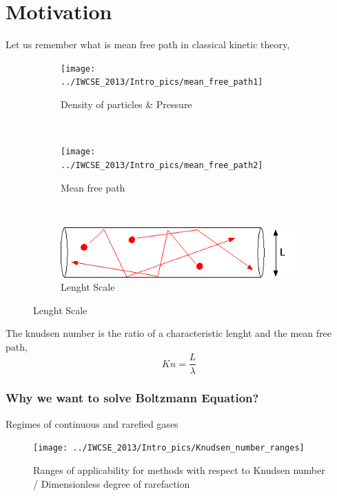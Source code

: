 \section{Motivation}

\begin{frame} 
  Let us remember what is mean free path in classical kinetic theory,
  \begin{figure}
        \centering
        \begin{subfigure}[b]{0.30\textwidth}
                \centering
                \texttt{[image: ../IWCSE\_2013/Intro\_pics/mean\_free\_path1]}
                \caption{Density of particles \& Pressure}
                \label{fig:particles_pressure}
        \end{subfigure}%
        ~ %
        \begin{subfigure}[b]{0.30\textwidth}
                \centering
                \texttt{[image: ../IWCSE\_2013/Intro\_pics/mean\_free\_path2]}
                \caption{Mean free path}
                \label{fig:mean_free_path}
				\end{subfigure}
				~ %
        \begin{subfigure}[b]{0.30\textwidth}
                \centering
                \includegraphics[trim = 0mm 0mm 0mm 0mm,clip,width=\textwidth]{../IWCSE_2013/Intro_pics/charac_length}
                \caption{Lenght Scale}
                \label{fig:lenght_scale}
				\end{subfigure}
	\label{fig:MeanFreePath_KnudsenNumber}
 \end{figure}
	The knudsen number is the ratio of a characteristic lenght and the mean free path,
	\begin{equation*}
	Kn = \frac{L}{\lambda}
	\end{equation*}
\end{frame}

\begin{frame} \frametitle{Why we want to solve Boltzmann Equation?}
  Regimes of continuous and rarefied gases
  \begin{figure}
  \centering
  \texttt{[image: ../IWCSE\_2013/Intro\_pics/Knudsen\_number\_ranges]}
  \caption{Ranges of applicability for methods with respect to Knudsen number / Dimensionless degree of rarefaction}
  \label{fig:Knudsen_number_ranges}
  \end{figure}
\end{frame}

